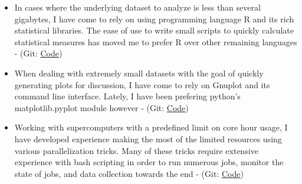 \documentclass[11pt]{ltxdoc}
\begin{document}
\begin{description}
\begin{itemize}
        \item In cases where the underlying dataset to analyze is less than several gigabytes, I have come to rely on using programming language R and its rich statistical libraries. The ease of use to write small scripts to quickly calculate statistical measures has moved me to prefer R over other remaining languages - (Git: \href{https://github.com/hlokavarapu/computational_tools/tree/master/R_scripts}{Code})
        
        \item When dealing with extremely small datasets with the goal of quickly generating plots for discussion, I have come to rely on Gnuplot and its command line interface. Lately, I have been prefering python's matplotlib.pyplot module however - (Git: \href{https://github.com/hlokavarapu/computational_tools/tree/master/Gnuplot_scripts}{Code})
        
        \item Working with supercomputers with a predefined limit on core hour usage, I have developed experience making the most of the limited resources using various parallelization tricks. Many of these tricks require extensive experience with bash scripting in order to run numerous jobs, monitor the state of jobs, and data collection towards the end - (Git: \href{https://github.com/hlokavarapu/computational_tools/tree/master/slurm_scripts}{Code})
      	                
      \end{itemize}
    

\end{description}
\end{document}
